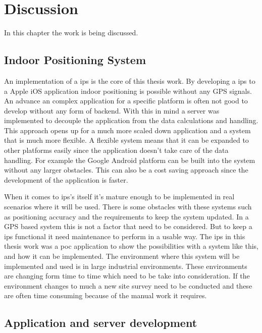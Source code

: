 \chapter{Discussion} \label{sec:discussion}
In this chapter the work is being discussed.


\section{Indoor Positioning System}\label{sec:discussionIps}
An implementation of a \acrfull{ips} is the core of this thesis work.
By developing a \acrshort{ips} to a Apple iOS application indoor positioning is possible without any GPS signals.
An advance an complex application for a specific platform is often not good to develop without any form of backend.
With this in mind a server was implemented to decouple the application from the data calculations and handling.
This approach opens up for a much more scaled down application and a system that is much more flexible.
A flexible system means that it can be expanded to other platforms easily since the application doesn't take care of the data handling.
For example the Google Android platform can be built into the system without any larger obstacles.
This can also be a cost saving approach since the development of the application is faster.

\bigskip

When it comes to \acrshort{ips}'s itself it's mature enough to be implemented in real scenarios where it will be used.
There is some obstacles with these systems such as positioning accuracy and the requirements to keep the system updated. 
In a GPS based system this is not a factor that need to be considered.
But to keep a \acrshort{ips} functional it need maintenance to perform in a usable way.
The \acrshort{ips} in this thesis work was a \acrfull{poc} application to show the possibilities with a system like this, and how it can be implemented.
The environment where this system will be implemented and used is in large industrial environments.
These environments are changing form time to time which need to be take into consideration.
If the environment changes to much a new site survey need to be conducted and these are often time consuming because of the manual work it requires.


\section{Application and server development}\label{sec:discussionAppDev}

